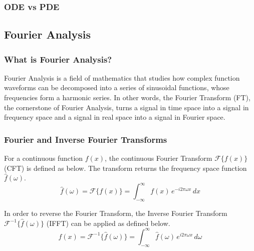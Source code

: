 \subsubsection{ODE vs PDE}

\subsection{Fourier Analysis}
\subsubsection{What is Fourier Analysis?}
Fourier Analysis is a field of mathematics that studies how complex function waveforms can be decomposed into a series of sinusoidal functions, whose frequencies form a harmonic series. In other words, the Fourier Transform (FT), the cornerstone of Fourier Analysis, turns a signal in time space into a signal in frequency space and a signal in real space into a signal in Fourier space.

\subsubsection{Fourier and Inverse Fourier Transforms}
\begin{definition}
    For a continuous function $f(x)$, the continuous Fourier Transform $\mathcal{F}\{ f(x) \}$ (CFT) is defined as below. The transform returns the frequency space function $\hat{f}(\omega)$.
    \[ \hat{f}(\omega) = \mathcal{F}\{ f(x) \} = \int_{-\infty}^{\infty} f(x)  \, e^{-i 2\pi \omega x} \,dx \]
\end{definition}

\begin{definition}
    In order to reverse the Fourier Transform, the Inverse Fourier Transform $\mathcal{F}^{-1}\{ \hat{f}(\omega) \}$ (IFFT) can be applied as defined below.
    \[ f(x) = \mathcal{F}^{-1}\{ \hat{f}(\omega) \} = \int_{-\infty}^{\infty} \hat{f}(\omega) \, e^{i 2\pi \omega x} \,d \omega \]
\end{definition}